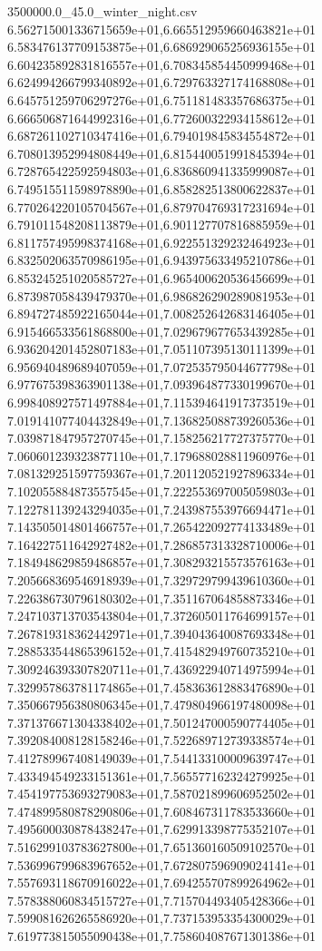 \begin{filecontents*}{3500000.0_45.0_winter_night.csv}
6.562715001336715659e+01,6.665512959660463821e+01
6.583476137709153875e+01,6.686929065256936155e+01
6.604235892831816557e+01,6.708345854450999468e+01
6.624994266799340892e+01,6.729763327174168808e+01
6.645751259706297276e+01,6.751181483357686375e+01
6.666506871644992316e+01,6.772600322934158612e+01
6.687261102710347416e+01,6.794019845834554872e+01
6.708013952994808449e+01,6.815440051991845394e+01
6.728765422592594803e+01,6.836860941335999087e+01
6.749515511598978890e+01,6.858282513800622837e+01
6.770264220105704567e+01,6.879704769317231694e+01
6.791011548208113879e+01,6.901127707816885959e+01
6.811757495998374168e+01,6.922551329232464923e+01
6.832502063570986195e+01,6.943975633495210786e+01
6.853245251020585727e+01,6.965400620536456699e+01
6.873987058439479370e+01,6.986826290289081953e+01
6.894727485922165044e+01,7.008252642683146405e+01
6.915466533561868800e+01,7.029679677653439285e+01
6.936204201452807183e+01,7.051107395130111399e+01
6.956940489689407059e+01,7.072535795044677798e+01
6.977675398363901138e+01,7.093964877330199670e+01
6.998408927571497884e+01,7.115394641917373519e+01
7.019141077404432849e+01,7.136825088739260536e+01
7.039871847957270745e+01,7.158256217727375770e+01
7.060601239323877110e+01,7.179688028811960976e+01
7.081329251597759367e+01,7.201120521927896334e+01
7.102055884873557545e+01,7.222553697005059803e+01
7.122781139243294035e+01,7.243987553976694471e+01
7.143505014801466757e+01,7.265422092774133489e+01
7.164227511642927482e+01,7.286857313328710006e+01
7.184948629859486857e+01,7.308293215573576163e+01
7.205668369546918939e+01,7.329729799439610360e+01
7.226386730796180302e+01,7.351167064858873346e+01
7.247103713703543804e+01,7.372605011764699157e+01
7.267819318362442971e+01,7.394043640087693348e+01
7.288533544865396152e+01,7.415482949760735210e+01
7.309246393307820711e+01,7.436922940714975994e+01
7.329957863781174865e+01,7.458363612883476890e+01
7.350667956380806345e+01,7.479804966197480098e+01
7.371376671304338402e+01,7.501247000590774405e+01
7.392084008128158246e+01,7.522689712739338574e+01
7.412789967408149039e+01,7.544133100009639747e+01
7.433494549233151361e+01,7.565577162324279925e+01
7.454197753693279083e+01,7.587021899606952502e+01
7.474899580878290806e+01,7.608467311783533660e+01
7.495600030878438247e+01,7.629913398775352107e+01
7.516299103783627800e+01,7.651360160509102570e+01
7.536996799683967652e+01,7.672807596909024141e+01
7.557693118670916022e+01,7.694255707899264962e+01
7.578388060834515727e+01,7.715704493405428366e+01
7.599081626265586920e+01,7.737153953354300029e+01
7.619773815055090438e+01,7.758604087671301386e+01

\end{filecontents*}
